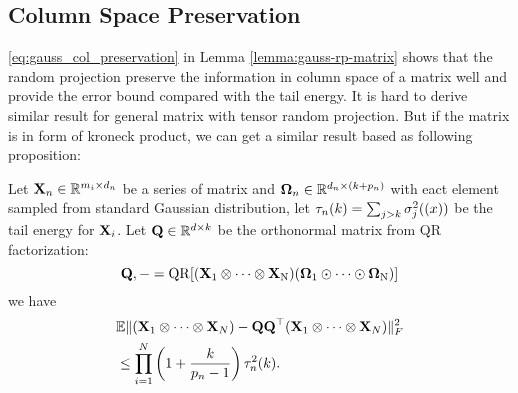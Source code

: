 \subsection{Column Space Preservation}
\eqref{eq:gauss_col_preservation} in Lemma \ref{lemma:gauss-rp-matrix} shows that the random projection preserve the information in column space of a matrix well and provide the error bound compared with the tail energy. It is hard to derive similar result for general matrix with tensor random projection. But if the matrix is in form of kroneck product, we can get a similar result based as following proposition:
\begin{prop}
Let $\mathbf{X}_n\in \mathbb{R}^{m_i\times d_n}$ be a series of matrix and $\mathbf{\Omega}_n\in \mathbb{R}^{d_n\times (k+p_n)}$ with eact element sampled from standard Gaussian distribution, let  $\tau_n(k) = \sum_{j>k} \sigma^2_j(\mathbf{(}x))$ be the tail energy for $\mathbf{X}_i$. Let $\mathbf{Q}\in \mathbb{R}^{d\times k}$ be the orthonormal matrix from QR factorization: 
\[
\mathbf{Q}, - = \rm{QR} [(\mathbf{X}_1\otimes \cdots \otimes \mathbf{X}_N)(\mathbf{\Omega}_1\odot \cdots \odot\mathbf{\Omega}_N)]
\]
we have
\begin{equation}
\begin{aligned}
&\mathbb{E} \| (\mathbf{X}_1\otimes \cdots \otimes \mathbf{X}_N) - \mathbf{QQ}^\top(\mathbf{X}_1\otimes \cdots \otimes \mathbf{X}_N)\|^2_F \\
& \le \prod_{i=1}^N  \left(1+\frac{k}{p_n-1}\right)\tau^2_n(k). 
\end{aligned}
\end{equation}
\end{prop}
